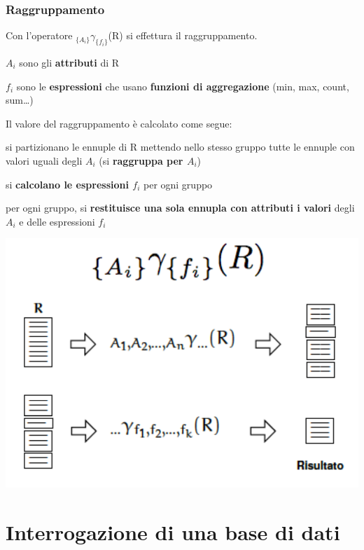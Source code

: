 \documentclass[10pt]{book}
\begin{document}
\subsection{Raggruppamento} Con l'operatore $_{\{A_i\}}\gamma_{\{f_i\}}$(R) si effettura il raggruppamento.
\begin{list}{}{}
	\item $A_i$ sono gli \textbf{attributi} di R
	\item $f_i$ sono le \textbf{espressioni} che usano \textbf{funzioni di aggregazione} (min, max, count, sum\ldots)
\end{list}
Il valore del raggruppamento è calcolato come segue:
\begin{list}{}{}
	\item si partizionano le ennuple di R mettendo nello stesso gruppo tutte le ennuple con valori uguali degli $A_i$ (si \textbf{raggruppa per $A_i$})
	\item si \textbf{calcolano le espressioni $f_i$} per ogni gruppo
	\item per ogni gruppo, si \textbf{restituisce una sola ennupla con attributi i valori} degli $A_i$ e delle espressioni $f_i$
\end{list}
\begin{center}
	\includegraphics[scale=0.5]{raggrup.png}
\end{center}
\chapter{Interrogazione di una base di dati}
\end{document}
